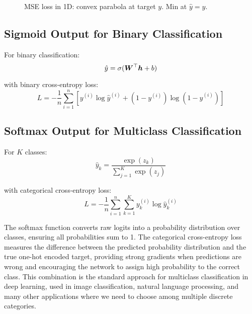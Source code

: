 \begin{figure}[htbp]
\centering
{}
\caption{MSE loss in 1D: convex parabola at target $y$. Min at $\hat y{=}y$.}
\label{fig:mse-1d}
\end{figure}

\subsection{Sigmoid Output for Binary Classification}

For binary classification:
\begin{equation}
\hat{y} = \sigma(\boldsymbol{W}^\top \boldsymbol{h} + b)
\end{equation}

with binary cross-entropy loss:
\begin{equation}
L = -\frac{1}{n} \sum_{i=1}^{n} [y^{(i)} \log \hat{y}^{(i)} + (1-y^{(i)}) \log(1-\hat{y}^{(i)})]
\end{equation}

\subsection{Softmax Output for Multiclass Classification}

For $K$ classes:
\begin{equation}
\hat{y}_k = \frac{\exp(z_k)}{\sum_{j=1}^{K} \exp(z_j)}
\end{equation}

with categorical cross-entropy loss:
\begin{equation}
L = -\frac{1}{n} \sum_{i=1}^{n} \sum_{k=1}^{K} y_k^{(i)} \log \hat{y}_k^{(i)}
\end{equation}

\begin{remark}
The softmax function converts raw logits into a probability distribution over classes, ensuring all probabilities sum to 1. The categorical cross-entropy loss measures the difference between the predicted probability distribution and the true one-hot encoded target, providing strong gradients when predictions are wrong and encouraging the network to assign high probability to the correct class. This combination is the standard approach for multiclass classification in deep learning, used in image classification, natural language processing, and many other applications where we need to choose among multiple discrete categories.
\end{remark}


